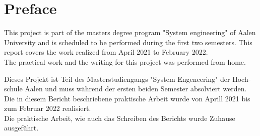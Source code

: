 \chapter*{Preface}
\label{preface}

This project is part of the masters degree program "System engineering" of Aalen University and is scheduled to be performed during the first two semesters. This report covers the work realized from April 2021 to February 2022.\\
The practical work and the writing for this project was performed from home.

\vspace*{25mm}

\begin{otherlanguage}{ngerman}
Dieses Projekt ist Teil des Masterstudiengangs "System Engeneering" der Hochschule Aalen und muss während der ersten beiden Semester absolviert werden. Die in diesem Bericht beschriebene praktische Arbeit wurde von Aprill 2021 bis zum Februar 2022 realisiert.\\
Die praktische Arbeit, wie auch das Schreiben des Berichts wurde Zuhause ausgeführt.
\end{otherlanguage}